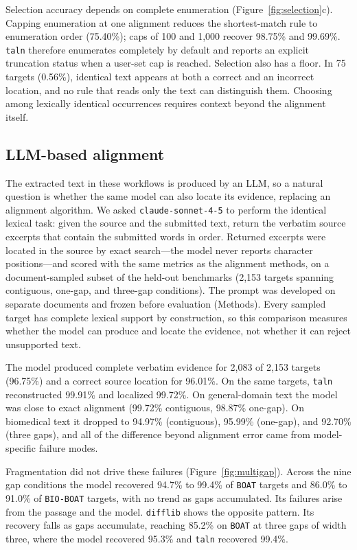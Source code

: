 \documentclass[10pt,twocolumn]{article}
\theoremstyle{plain}
\theoremstyle{definition}
\theoremstyle{remark}
\begin{document}
Selection accuracy depends on complete enumeration (Figure~\ref{fig:selection}c). Capping enumeration at one alignment reduces the shortest-match rule to enumeration order (75.40\%); caps of 100 and 1,000 recover 98.75\% and 99.69\%. \texttt{taln} therefore enumerates completely by default and reports an explicit truncation status when a user-set cap is reached. Selection also has a floor. In 75 targets (0.56\%), identical text appears at both a correct and an incorrect location, and no rule that reads only the text can distinguish them. Choosing among lexically identical occurrences requires context beyond the alignment itself.

\subsection{LLM-based alignment}
The extracted text in these workflows is produced by an LLM, so a natural question is whether the same model can also locate its evidence, replacing an alignment algorithm. We asked \texttt{claude-sonnet-4-5} to perform the identical lexical task: given the source and the submitted text, return the verbatim source excerpts that contain the submitted words in order. Returned excerpts were located in the source by exact search---the model never reports character positions---and scored with the same metrics as the alignment methods, on a document-sampled subset of the held-out benchmarks (2,153 targets spanning contiguous, one-gap, and three-gap conditions). The prompt was developed on separate documents and frozen before evaluation (Methods). Every sampled target has complete lexical support by construction, so this comparison measures whether the model can produce and locate the evidence, not whether it can reject unsupported text.

The model produced complete verbatim evidence for 2,083 of 2,153 targets (96.75\%) and a correct source location for 96.01\%. On the same targets, \texttt{taln} reconstructed 99.91\% and localized 99.72\%. On general-domain text the model was close to exact alignment (99.72\% contiguous, 98.87\% one-gap). On biomedical text it dropped to 94.97\% (contiguous), 95.99\% (one-gap), and 92.70\% (three gaps), and all of the difference beyond alignment error came from model-specific failure modes.

Fragmentation did not drive these failures (Figure~\ref{fig:multigap}). Across the nine gap conditions the model recovered 94.7\% to 99.4\% of \texttt{BOAT} targets and 86.0\% to 91.0\% of \texttt{BIO-BOAT} targets, with no trend as gaps accumulated. Its failures arise from the passage and the model. \texttt{difflib} shows the opposite pattern. Its recovery falls as gaps accumulate, reaching 85.2\% on \texttt{BOAT} at three gaps of width three, where the model recovered 95.3\% and \texttt{taln} recovered 99.4\%.
\end{document}
